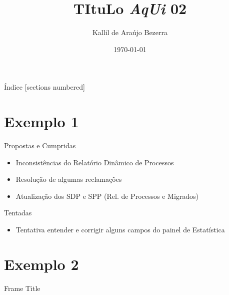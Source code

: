 \documentclass[10pt]{beamer}
\title{TItuLo \textit{AqUi} 02}
\date{\today}
\author{Kallil de Araújo Bezerra}
\institute{Programa de Residência da JFRN}
\begin{document}
\maketitle

\begin{frame}{Índice}
  [sections numbered]
  \tableofcontents[hideallsubsections]
\end{frame}


\section{Exemplo 1}

\begin{frame}[fragile]{Propostas e Cumpridas}

  \begin{itemize}
      \item Inconsistências do Relatório Dinâmico de Processos
      \item Resolução de algumas reclamações
      \item Atualização dos SDP e SPP (Rel. de Processos e Migrados)
  \end{itemize}
\end{frame}



\begin{frame}[fragile]{Tentadas}

  \begin{itemize}
      \item Tentativa entender e corrigir alguns campos do painel de Estatística
  \end{itemize}
\end{frame}




\section{Exemplo 2}

\begin{frame}{Frame Title}
    
\end{frame}










%  
  

\end{document}
